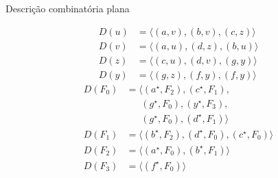 \documentclass{IFES-beamer}
\newcommand{\defi}[1]{\textbf{#1}} %
\begin{document}
\begin{frame}{Descrição combinatória plana}
\begin{minipage}[H]{0.1\textwidth}
\begin{align*}
D(u)&=\langle (a,v), (b,v), (c,z)\rangle\\
D(v)&=\langle (a,u), (d,z), (b,u)  \rangle\\
D(z)&=\langle (c,u), (d,v), (g,y) \rangle \\
D(y)&=\langle (g,z), (f,y), (f,y) \rangle
\end{align*}
\begin{align*}
D(F_0)&=\langle (a^\star, F_2), (c^\star, F_1), \\
      &~~~~~~~(g^\star, F_0), (y^\star, F_3), \\
      &~~~~~~~(g^\star, F_0), (d^\star, F_1)\rangle\\
D(F_1)&=\langle (b^\star, F_2), (d^\star, F_0), (c^\star, F_0)  \rangle\\
D(F_2)&=\langle (a^\star, F_0), (b^\star, F_1)\rangle \\
D(F_3)&=\langle (f^\star, F_0)\rangle
\end{align*}
\end{minipage}
\hspace{-1cm}
\begin{minipage}[H]{0.4\textwidth}
\begin{figure}[H]
\scalebox{1.2}{
\centering

}
\label{fig:MSF-basico-1}
\end{figure}
\end{minipage}
\end{frame}
\end{document}
